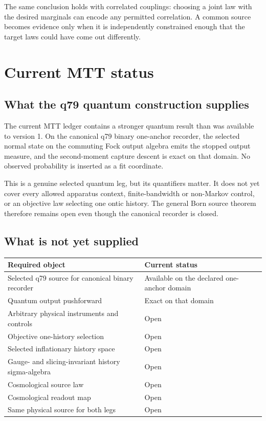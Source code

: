 \documentclass[11pt]{article}
\begin{document}
The same conclusion holds with correlated couplings: choosing a joint law with
the desired marginals can encode any permitted correlation. A common source
becomes evidence only when it is independently constrained enough that the
target laws could have come out differently.

\section{Current MTT status}

\subsection{What the q79 quantum construction supplies}

The current MTT ledger contains a stronger quantum result than was available to
version 1. On the canonical q79 binary one-anchor recorder, the selected normal
state on the commuting Fock output algebra emits the stopped output measure,
and the second-moment capture descent is exact on that domain. No observed
probability is inserted as a fit coordinate.

This is a genuine selected quantum leg, but its quantifiers matter. It does not
yet cover every allowed apparatus context, finite-bandwidth or non-Markov
control, or an objective law selecting one ontic history. The general Born
source theorem therefore remains open even though the canonical recorder is
closed.

\subsection{What is not yet supplied}

\begin{center}
\begin{tabular}{p{}p{}}
\toprule
Required object & Current status\\
\midrule
Selected q79 source for canonical binary recorder
& Available on the declared one-anchor domain\\
Quantum output pushforward
& Exact on that domain\\
Arbitrary physical instruments and controls
& Open\\
Objective one-history selection
& Open\\
Selected inflationary history space
& Open\\
Gauge- and slicing-invariant history sigma-algebra
& Open\\
Cosmological source law
& Open\\
Cosmological readout map
& Open\\
Same physical source for both legs
& Open\\
\bottomrule
\end{tabular}
\end{center}
\end{document}
